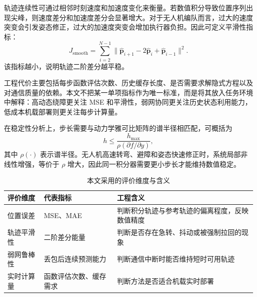 \documentclass[UTF8,zihao=-4]{ctexart}
\begin{document}
轨迹连续性可通过相邻时刻速度和加速度变化来衡量。若数值积分导致位置序列出现尖峰，则速度差分和加速度差分会显著增大。对于无人机编队而言，过大的速度突变会引发姿态修正，过大的加速度突变会增加执行器负担。因此可定义平滑性指标：
\begin{equation}
  J_{\mathrm{smooth}}=\sum_{i=2}^{N-1}\|\hat{\bm p}_{i+1}-2\hat{\bm p}_{i}+\hat{\bm p}_{i-1}\|^2.
  \label{eq:smooth}
\end{equation}
该指标越小，说明轨迹二阶差分越平稳。

工程代价主要包括每步函数评估次数、历史缓存长度、是否需要求解隐式方程以及对通信质量的依赖。本文不把某一单项指标作为唯一标准，而是将其放入任务环境中解释：高动态绕障更关注 MSE 和平滑性，弱网协同更关注历史状态利用能力，低成本机载部署则更关注每步计算量。

在稳定性分析上，步长需要与动力学雅可比矩阵的谱半径相匹配，可概括为
\begin{equation}
  h\leq\frac{h_{\max}}{\rho(\partial f/\partial y)},
  \label{eq:stability-step}
\end{equation}
其中 $\rho(\cdot)$ 表示谱半径。无人机高速转弯、避障和姿态快速修正时，系统局部非线性增强，等价于 $\rho$ 增大，因此同一积分器需要更小步长才能维持数值稳定。

\begin{table}[H]
  \centering
  \caption{本文采用的评价维度与含义}
  \label{tab:metrics}
  \begin{tabularx}{\textwidth}{>{\centering\arraybackslash}p{3cm} >{\centering\arraybackslash}p{3.2cm} X}
    \toprule
    评价维度 & 代表指标 & 工程含义 \\
    \midrule
    位置误差 & MSE、MAE & 判断积分轨迹与参考轨迹的偏离程度，反映数值精度 \\
    轨迹平滑性 & 二阶差分能量 & 判断是否存在急转、抖动或被强制拉回的现象 \\
    弱网鲁棒性 & 丢包后连续预测能力 & 判断通信中断时能否维持短时可用轨迹 \\
    实时计算量 & 函数评估次数、缓存需求 & 判断方法是否适合机载实时部署 \\
    \bottomrule
  \end{tabularx}
\end{table}
\end{document}
